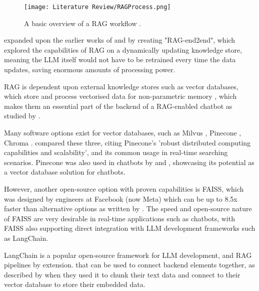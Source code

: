 \begin{figure}[H] 
    \centering
    \texttt{[image: Literature Review/RAGProcess.png]}
    \caption{A basic overview of a RAG workflow \autocite{openai_retrieval_nodate}.}
    \label{fig:RAGProcess}
\end{figure}

\textcite{siriwardhana_improving_2023} expanded upon the earlier works of \textcite{karpukhin_dense_2020} and \textcite{lewis_pre-training_2020} by creating 
"RAG-end2end", which explored the capabilities of RAG on a dynamically updating knowledge store, meaning the LLM itself would not have to be retrained 
every time the data updates, saving enormous amounts of processing power.

RAG is dependent upon external knowledge stores such as vector databases, which store and process vectorised data
for non-parametric memory \autocite{li_modernization_2023}, which makes them an essential part of the backend of 
a RAG-enabled chatbot as studied by \textcite{odede_jaybot_2024}. 

Many software options exist for
vector databases, such as Milvus \autocite{wang_milvus_2021}, Pinecone \autocite{pinecone_pinecone_nodate}, Chroma \autocite{chroma_chroma_nodate}.
\textcite{xie_brief_2023} compared these three, citing Pinecone's 'robust distributed computing capabilities and scalability', and its common usage 
in real-time searching scenarios. Pinecone was also used in chatbots by \textcite{odede_jaybot_2024} and \textcite{singer_development_2024}, showcasing its potential 
as a vector database solution for chatbots.

However, another open-source option with proven capabilities is FAISS, which was designed by engineers at Facebook (now Meta) which can be up to 8.5x faster than 
alternative options as written by \textcite{johnsonBillionscaleSimilaritySearch2017}. The speed and open-source nature of FAISS are very desirable in real-time 
applications such as chatbots, with FAISS also supporting direct integration with LLM development frameworks such as LangChain.

LangChain \autocite{langchain_introduction_nodate} is a popular open-source framework for LLM development, and RAG pipelines by extension. that can be used to connect backend elements 
together, as described by \textcite{singer_development_2024} when they used it to chunk their text data and connect to their vector database to store 
their embedded data. 


